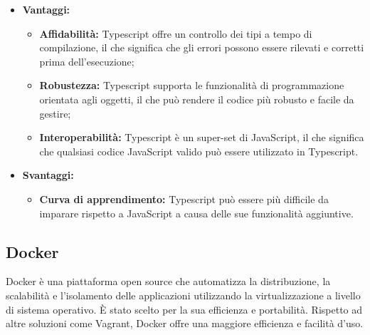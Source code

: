 \documentclass[10pt, a4paper]{article}
\begin{document}
\begin{itemize}
\item \textbf{Vantaggi:}
\begin{itemize}
\item \textbf{Affidabilità:} Typescript offre un controllo dei tipi a tempo di compilazione, il che significa che gli errori possono essere rilevati e corretti prima dell'esecuzione;
\item \textbf{Robustezza:} Typescript supporta le funzionalità di programmazione orientata agli oggetti, il che può rendere il codice più robusto e facile da gestire;
\item \textbf{Interoperabilità:} Typescript è un super-set di JavaScript, il che significa che qualsiasi codice JavaScript valido può essere utilizzato in Typescript.
\end{itemize}
\item \textbf{Svantaggi:}
\begin{itemize}
\item \textbf{Curva di apprendimento:} Typescript può essere più difficile da imparare rispetto a JavaScript a causa delle sue funzionalità aggiuntive.
\end{itemize}
\end{itemize}

\subsection{Docker}
Docker è una piattaforma open source che automatizza la distribuzione, la scalabilità e l'isolamento delle applicazioni utilizzando la virtualizzazione a livello di sistema operativo. È stato scelto per la sua efficienza e portabilità. Rispetto ad altre soluzioni come Vagrant, Docker offre una maggiore efficienza e facilità d'uso.
\end{document}

